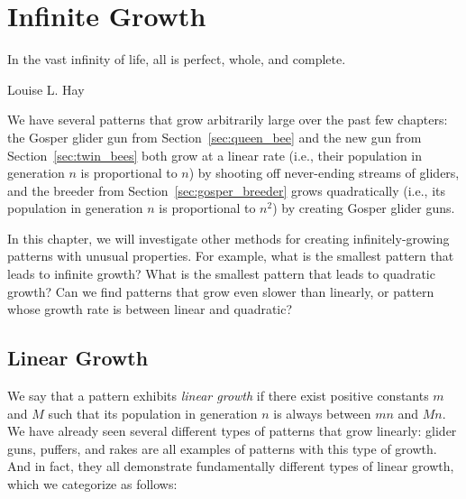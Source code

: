 
\renewcommand{\chapterfolder}{infinite_growth/}
\chapter{Infinite Growth}\label{chp:infinite_growth}


\vspace*{-0.4in}
\epigraph{In the vast infinity of life, all is perfect, whole, and complete.}{Louise L. Hay}
\vspace*{0.4in}

We have several patterns that grow arbitrarily large over the past few chapters: the Gosper glider gun from Section~\ref{sec:queen_bee} and the new gun from Section~\ref{sec:twin_bees} both grow at a linear rate (i.e., their population in generation $n$ is proportional to $n$) by shooting off never-ending streams of gliders, and the breeder from Section~\ref{sec:gosper_breeder} grows quadratically (i.e., its population in generation $n$ is proportional to $n^2$) by creating Gosper glider guns.

In this chapter, we will investigate other methods for creating infinitely-growing patterns with unusual properties. For example, what is the smallest pattern that leads to infinite growth? What is the smallest pattern that leads to quadratic growth? Can we find patterns that grow even slower than linearly, or pattern whose growth rate is between linear and quadratic?



\section{Linear Growth}\label{sec:linear_growth}

We say that a pattern exhibits \emph{linear growth} if there exist positive constants $m$ and $M$ such that its population in generation $n$ is always between $mn$ and $Mn$. We have already seen several different types of patterns that grow linearly: glider guns, puffers, and rakes are all examples of patterns with this type of growth. And in fact, they all demonstrate fundamentally different types of linear growth, which we categorize as follows:

